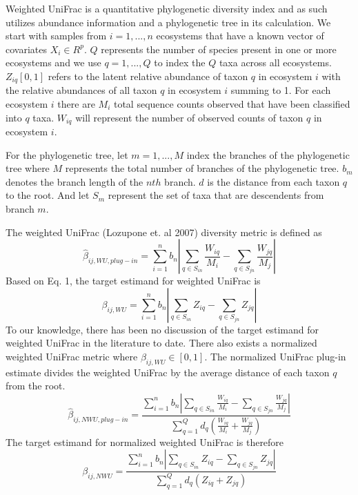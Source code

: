 \documentclass{article}
\begin{document}
Weighted UniFrac is a quantitative phylogenetic diversity index and as such utilizes abundance information and a phylogenetic tree in its calculation. We start with samples from $i = 1,..., n$ ecosystems that have a known vector of covariates $X_i \in R^p$. $Q$ represents the number of species present in one or more ecosystems and we use $q = 1,...,Q$ to index the $Q$ taxa across all ecosystems. $Z_{iq} [0,1]$ refers to the latent relative abundance of taxon $q$ in ecosystem $i$ with the relative abundances of all taxon $q$ in ecosystem $i$ summing to 1. For each ecosystem $i$ there are $M_i$ total sequence counts observed that have been classified into $q$ taxa. $W_{iq}$ will represent the number of observed counts of taxon $q$ in ecosystem $i$.

For the phylogenetic tree, let $m = 1,..., M$ index the branches of the phylogenetic tree where $M$ represents the total number of branches of the phylogenetic tree. $b_m$ denotes the branch length of the $nth$ branch. $d$ is the distance from each taxon $q$ to the root. And let $S_m$ represent the set of taxa that are descendents from branch $m$.

The weighted UniFrac (Lozupone et. al 2007) diversity metric is defined as
\begin{equation}
    \hat{\beta}_{ij,WU,plug-in}=\sum_{i=1}^n b_n |\sum_{q \in S_{in}} \frac{W_{iq}}{M_i}-\sum_{q \in S_{jn}} \frac{W_{jq}}{M_j}|
\end{equation}
Based on Eq. 1, the target estimand for weighted UniFrac is
\begin{equation}
    \beta_{ij,WU}=\sum_{i=1}^n b_n |\sum_{q \in S_{in}} Z_{iq} -\sum_{q \in S_{jn}} Z_{jq}|
\end{equation}
To our knowledge, there has been no discussion of the target estimand for weighted UniFrac in the literature to date. There also exists a normalized weighted UniFrac metric where $\beta_{ij,WU} \in [0,1]$.  The normalized UniFrac plug-in estimate divides the weighted UniFrac by the average distance of each taxon $q$ from the root.
\begin{equation}\label{eq:plugin}
    \hat{\beta}_{ij,NWU,plug-in}=\frac{\sum_{i=1}^n b_n |\sum_{q \in S_{in}} \frac{W_{iq}}{M_i}-\sum_{q \in S_{jn}} \frac{W_{jq}}{M_j}|}{\sum_{q=1}^Q d_q (\frac{W_{iq}}{M_i}+\frac{W_{jq}}{M_j})}
\end{equation}
The target estimand for normalized weighted UniFrac is therefore
\begin{equation}
    \beta_{ij,NWU}=\frac{\sum_{i=1}^n b_n |\sum_{q \in S_{in}} Z_{iq}-\sum_{q \in S_{jn}} Z_{jq}|}{\sum_{q=1}^Q d_q (Z_{iq}+Z_{jq})}
\end{equation}
\end{document}
